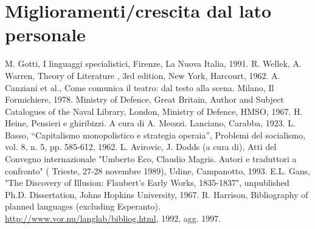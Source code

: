 \documentclass[12pt]{report}
\begin{document}
\newpage
\section{Miglioramenti/crescita dal lato personale}


%
%

%
%
\begin{thebibliography}{00}
%
M. Gotti, I linguaggi specialistici, Firenze, La Nuova Italia, 1991.
%
R. Wellek, A. Warren, Theory of Literature , 3rd edition, New York, Harcourt, 1962.
%
A. Canziani et al., Come comunica il teatro: dal testo alla scena. Milano, Il Formichiere, 1978.
%
Ministry of Defence, Great Britain, Author and Subject Catalogues of the Naval Library, London, Ministry of Defence, HMSO, 1967.
%
H. Heine, Pensieri e ghiribizzi. A cura di A. Meozzi. Lanciano, Carabba, 1923.
%
L. Basso, ``Capitalismo monopolistico e strategia operaia'', Problemi del socialismo, vol. 8, n. 5, pp. 585-612, 1962.
%
L. Avirovic, J. Dodds (a cura di), Atti del Convegno internazionale "Umberto Eco, Claudio Magris. Autori e traduttori a confronto" ( Trieste, 27-28 novembre 1989), Udine, Campanotto, 1993.
%
E.L. Gans, "The Discovery of Illusion: Flaubert's Early Works, 1835-1837", unpublished Ph.D. Dissertation, Johns Hopkins University, 1967.
%
R. Harrison, Bibliography of planned languages (excluding Esperanto).  \url{http://www.vor.nu/langlab/bibliog.html}, 1992, agg. 1997.
%
\end{thebibliography}
% 
\end{document}
